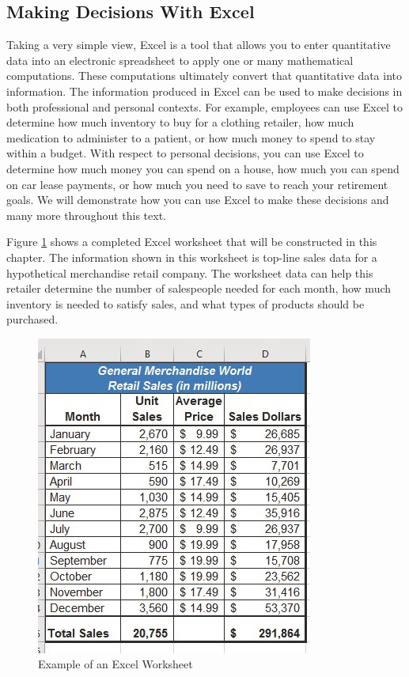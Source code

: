 \subsection{Making Decisions With Excel}

Taking a very simple view, Excel is a tool that allows you to enter quantitative data into an electronic spreadsheet to apply one or many mathematical computations. These computations ultimately convert that quantitative data into information. The information produced in Excel can be used to make decisions in both professional and personal contexts. For example, employees can use Excel to determine how much inventory to buy for a clothing retailer, how much medication to administer to a patient, or how much money to spend to stay within a budget. With respect to personal decisions, you can use Excel to determine how much money you can spend on a house, how much you can spend on car lease payments, or how much you need to save to reach your retirement goals. We will demonstrate how you can use Excel to make these decisions and many more throughout this text.

Figure \ref{01:fig01} shows a completed Excel worksheet that will be constructed in this chapter. The information shown in this worksheet is top-line sales data for a hypothetical merchandise retail company. The worksheet data can help this retailer determine the number of salespeople needed for each month, how much inventory is needed to satisfy sales, and what types of products should be purchased.

\begin{figure}[H]
	\centering
	\includegraphics[width=\maxwidth{.95\linewidth}]{gfx/ch01_fig01}
	\caption{Example of an Excel Worksheet}
	\label{01:fig01}
\end{figure}

